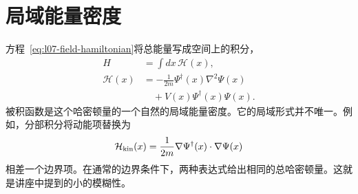 \begin{classroomqa}
\end{classroomqa}

\section{局域能量密度}

方程~\eqref{eq:l07-field-hamiltonian}将总能量写成空间上的积分，
\begin{equation}
\begin{aligned}
H&=\int dx\,\mathcal H(x),\\
\mathcal H(x)
&=-\frac{1}{2m}\Psi^\dagger(x)\nabla^2\Psi(x)\\
&\quad+V(x)\Psi^\dagger(x)\Psi(x).
\end{aligned}
\label{eq:l07-hamiltonian-density}
\end{equation}
被积函数是这个哈密顿量的一个自然的局域能量密度。它的局域形式并不唯一。例如，分部积分将动能项替换为
\begin{equation}
\mathcal H_{\rm kin}(x)
=\frac{1}{2m}\nabla\Psi^\dagger(x)\mathbin{\cdot}\nabla\Psi(x)
\label{eq:l07-kinetic-density}
\end{equation}
相差一个边界项。在通常的边界条件下，两种表达式给出相同的总哈密顿量。这就是讲座中提到的小的模糊性。

\begin{classroomqa}
\end{classroomqa}

\begin{classroomqa}
\end{classroomqa}

\begin{classroomqa}
\end{classroomqa}

